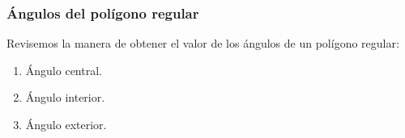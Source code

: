 \documentclass[14pt]{beamer}
\begin{document}
\begin{frame}
\frametitle{Ángulos del polígono regular}
Revisemos la manera de obtener el valor de los ángulos de un polígono regular:
\pause
{}
\begin{enumerate}[<+->]
\item Ángulo central.
\item Ángulo interior.
\item Ángulo exterior.
\end{enumerate}
\end{frame}
\end{document}
